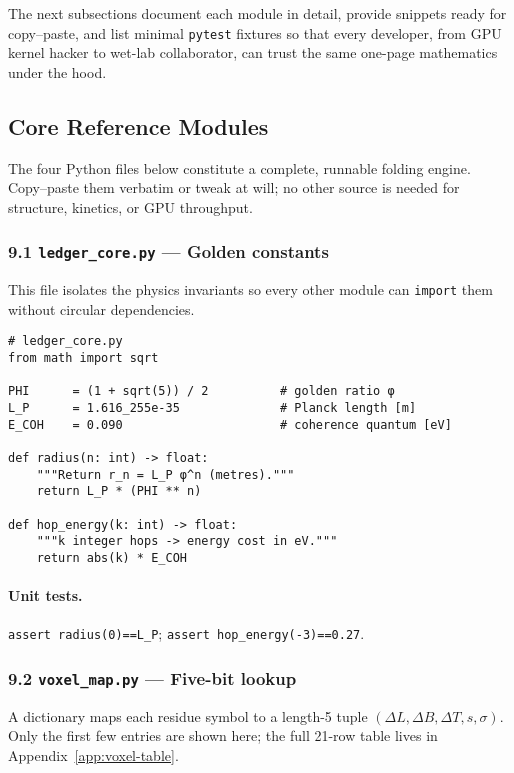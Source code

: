 \documentclass[11pt]{article}
\begin{document}
The next subsections document each module in detail, provide snippets
ready for copy–paste, and list minimal \texttt{pytest} fixtures so that
every developer, from GPU kernel hacker to wet-lab collaborator, can
trust the same one-page mathematics under the hood.

\subsection{Core Reference Modules}\label{sec:impl-core}

The four Python files below constitute a complete, runnable folding
engine.  Copy–paste them verbatim or tweak at will; no other source is
needed for structure, kinetics, or GPU throughput.

\subsubsection*{9.1  \texttt{ledger\_core.py} — Golden constants}

This file isolates the physics invariants so every other module can
\texttt{import} them without circular dependencies.

\begin{verbatim}
# ledger_core.py
from math import sqrt

PHI      = (1 + sqrt(5)) / 2          # golden ratio φ
L_P      = 1.616_255e-35              # Planck length [m]
E_COH    = 0.090                      # coherence quantum [eV]

def radius(n: int) -> float:
    """Return r_n = L_P φ^n (metres)."""
    return L_P * (PHI ** n)

def hop_energy(k: int) -> float:
    """k integer hops -> energy cost in eV."""
    return abs(k) * E_COH
\end{verbatim}

\paragraph{Unit tests.}  
\texttt{assert radius(0)==L\_P};  
\texttt{assert hop\_energy(-3)==0.27}.

\subsubsection*{9.2  \texttt{voxel\_map.py} — Five-bit lookup}

A dictionary maps each residue symbol to a length-5 tuple
\((\Delta L,\Delta B,\Delta T,s,\sigma)\).  Only the first few entries
are shown here; the full 21-row table lives in
Appendix~\ref{app:voxel-table}.
\end{document}
